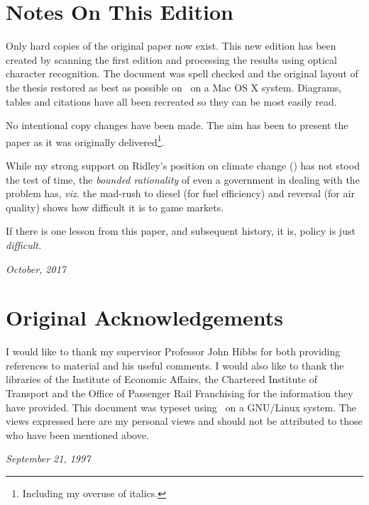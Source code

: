\thispagestyle{plain}
\section{Notes On This Edition}

Only hard copies of the original paper now exist. This new edition has been created by scanning the first edition and processing the results using optical character recognition. The document was spell checked and the original layout of the thesis restored as best as possible on \XeLaTeX \ on a Mac OS X system. Diagrams, tables and citations have all been recreated so they can be most easily read.

No intentional copy changes have been made. The aim has been to present the paper as it was originally delivered\footnote{Including my overuse of italics.}.

While my strong support on Ridley's position on climate change (\cite{Ridley:1996}) has not stood the test of time, the \textit{bounded rationality} of even a government in dealing with the problem has, \textit{viz.} the mad-rush to diesel (for fuel efficiency) and reversal (for air quality) shows how difficult it is to game markets. 

If there is one lesson from this paper, and subsequent history, it is, policy is just \textit{difficult.}

\textit{October, 2017}

\section{Original Acknowledgements}

I would like to thank my supervisor Professor John Hibbs for both providing references to material and his useful comments. I would also like to thank the libraries of the Institute of Economic Affairs, the Chartered Institute of Transport and the Office of Passenger Rail Franchising for the information they have provided. This document was typeset using \LaTeXe  \ on a GNU/Linux system. The views expressed here are my personal views and should not be attributed to those who have been mentioned above.

\textit{September 21, 1997}